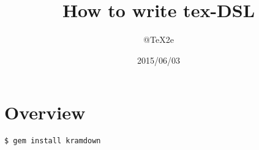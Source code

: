 \documentclass[a4j,titlepage]{jarticle}
\title{How to write tex-DSL}
\author{@TeX2e}
\date{2015/06/03}
\begin{document}
\maketitle{}
\thispagestyle{empty}
\newpage{}

\section{Overview}
\begin{screen}
\begin{verbatim}
$ gem install kramdown
\end{verbatim}
\end{screen}
\begin{center}
\end{center}
\end{document}
